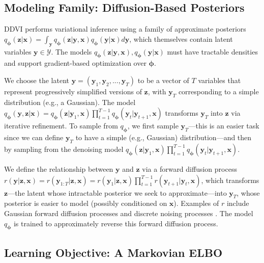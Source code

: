\documentclass[letterpaper]{article} %
\newcommand{\bx}{\mathbf{x}}
\newcommand{\bz}{\mathbf{z}}
\newcommand{\by}{\mathbf{y}}
\let\oldphi\phi
\renewcommand{\phi}{{\boldsymbol \oldphi}}
\begin{document}
\subsection{Modeling Family: Diffusion-Based Posteriors}

DDVI performs variational inference using a family of approximate posteriors $q_\phi(\bz|\bx) = \int_\by q_\phi(\bz| \by,\bx) q_\phi(\by|\bx) d\by$, which themselves contain latent variables $\by \in \mathcal{Y}$.
The models $q_\phi(\bz| \by,\bx), q_\phi(\by|\bx)$ must have tractable densities and support gradient-based optimization over $\phi$.

We choose the latent $\by = (\by_1, \by_2, ..., \by_T)$ to be  a vector of $T$ variables that represent progressively simplified versions of $\bz$, with $\by_T$ corresponding to a simple distribution (e.g., a Gaussian).
The model $q_\phi(\by, \bz|\bx) = q_\phi(\bz| \by_1,\bx) \prod_{t=1}^{T-1} q_\phi(\by_t|\by_{t+1},\bx)$ transforms $\by_T$ into $\bz$ via iterative refinement.
To sample from $q_\phi$, we first sample $\by_T$---this is an easier task since we can define $\by_T$ to have a simple (e.g., Gaussian) distribution---and then by sampling from the denoising model $q_\phi(\bz| \by_1,\bx) \prod_{t=1}^{T-1} q_\phi(\by_t|\by_{t+1},\bx)$. 

We define the relationship between $\by$ and $\bz$ via a forward diffusion process $r(\by|\bz,\bx) = r(\by_{1:T}|\bz,\bx) =  r(\by_1|\bz,\bx)\prod_{t=1}^{T-1} r(\by_{t+1}|\by_{t},\bx) $,
which transforms $\bz$---the latent whose intractable posterior we seek to approximate---into $\by_T$, whose posterior is easier to model (possibly conditioned on $\bx$).
Examples of $r$ include Gaussian forward diffusion processes and discrete noising processes \citep{austin2021structured}.
The model $q_\phi$ is trained to approximately reverse this forward diffusion process.

\subsection{Learning Objective: A Markovian ELBO}
\end{document}
